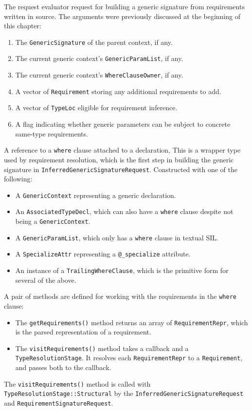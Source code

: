 \documentclass[../generics]{subfiles}
\begin{document}
The request evaluator request for building a generic signature from requirements written in source. The arguments were previously discussed at the beginning of this chapter:
\begin{enumerate}
\item The \texttt{GenericSignature} of the parent context, if any.
\item The current generic context's \texttt{GenericParamList}, if any.
\item The current generic context's \texttt{WhereClauseOwner}, if any.
\item A vector of \texttt{Requirement} storing any additional requirements to add.
\item A vector of \texttt{TypeLoc} eligible for requirement inference.
\item A flag indicating whether generic parameters can be subject to concrete same-type requirements.
\end{enumerate}

A reference to a \texttt{where} clause attached to a declaration, This is a wrapper type used by requirement resolution, which is the first step in building the generic signature in \texttt{InferredGenericSignatureRequest}. Constructed with one of the following:
\begin{itemize}
\item A \texttt{GenericContext} representing a generic declaration.
\item An \texttt{AssociatedTypeDecl}, which can also have a \texttt{where} clause despite not being a \texttt{GenericContext}.
\item A \texttt{GenericParamList}, which only has a \texttt{where} clause in textual SIL.
\item A \texttt{SpecializeAttr} representing a \verb|@_specialize| attribute.
\item An instance of a \texttt{TrailingWhereClause}, which is the primitive form for several of the above.
\end{itemize}
A pair of methods are defined for working with the requirements in the \texttt{where} clause:
\begin{itemize}
\item The \texttt{getRequirements()} method returns an array of \texttt{RequirementRepr}, which is the parsed representation of a requirement.
\item The \texttt{visitRequirements()} method takes a callback and a \texttt{TypeResolutionStage}. It resolves each \texttt{RequirementRepr} to a \texttt{Requirement}, and passes both to the callback.
\end{itemize}
The \texttt{visitRequirements()} method is called with \texttt{TypeResolutionStage::Structural} by the \texttt{InferredGenericSignatureRequest} and \texttt{RequirementSignatureRequest}.
\end{document}
